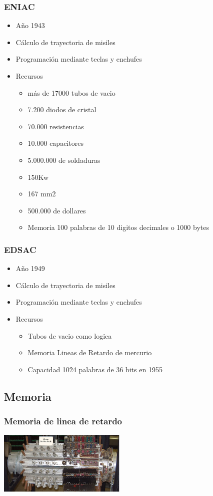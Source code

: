 \documentclass{beamer}
\begin{document}
\begin{frame}
\frametitle{ENIAC}
\begin{itemize}
	\item Año 1943
	\item Cálculo de trayectoria de misiles
	\item Programación mediante teclas y enchufes
	\item Recursos
		\begin{itemize}
			\item más de 17000 tubos de vacio
			\item 7.200 diodos de cristal
			\item 70.000 resistencias
			\item 10.000 capacitores
			\item 5.000.000 de soldaduras
			\item 150Kw
			\item 167 mm2
			\item 500.000 de dollares
			\item Memoria 100 palabras de 10 digitos decimales o 1000 bytes
		\end{itemize}
\end{itemize}
\end{frame}

\begin{frame}
\frametitle{EDSAC}
\begin{itemize}
	\item Año 1949
	\item Cálculo de trayectoria de misiles
	\item Programación mediante teclas y enchufes
	\item Recursos
		\begin{itemize}
			\item Tubos de vacio como logica
			\item Memoria Lineas de Retardo de mercurio
			\item Capacidad 1024 palabras de 36 bits en 1955
		\end{itemize}
\end{itemize}
\end{frame}

\subsection{Memoria}
\begin{frame}
\frametitle{Memoria de linea de retardo}
\includegraphics[height=3cm]{Mercury_memory.jpg}
\end{frame}
\end{document}
